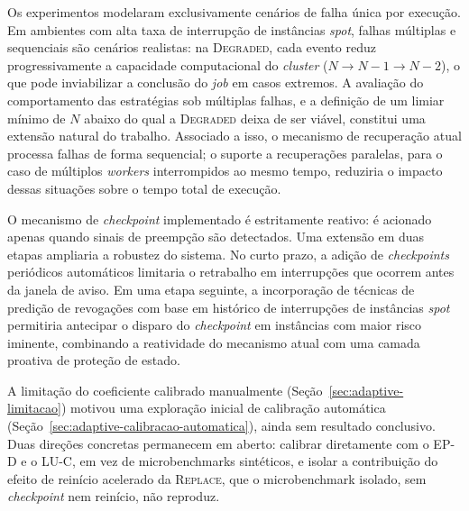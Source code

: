 Os experimentos modelaram exclusivamente cenários de falha única por execução. Em
ambientes com alta taxa de interrupção de instâncias \textit{spot}, falhas múltiplas e
sequenciais são cenários realistas: na \textsc{Degraded}, cada evento reduz
progressivamente a capacidade computacional do \textit{cluster}
($N \rightarrow N\!-\!1 \rightarrow N\!-\!2$), o que pode inviabilizar a conclusão do
\textit{job} em casos extremos. A avaliação do comportamento das estratégias sob
múltiplas falhas, e a definição de um limiar mínimo de $N$ abaixo do qual a
\textsc{Degraded} deixa de ser viável, constitui uma extensão natural do trabalho.
Associado a isso, o mecanismo de recuperação atual processa falhas de forma sequencial;
o suporte a recuperações paralelas, para o caso de múltiplos \textit{workers}
interrompidos ao mesmo tempo, reduziria o impacto dessas situações sobre o tempo total
de execução.

O mecanismo de \textit{checkpoint} implementado é estritamente reativo: é acionado
apenas quando sinais de preempção são detectados. Uma extensão em duas etapas ampliaria
a robustez do sistema. No curto prazo, a adição de \textit{checkpoints} periódicos
automáticos limitaria o retrabalho em interrupções que ocorrem antes da janela de aviso.
Em uma etapa seguinte, a incorporação de técnicas de predição de revogações com base em
histórico de interrupções de instâncias \textit{spot} permitiria antecipar o disparo do
\textit{checkpoint} em instâncias com maior risco iminente, combinando a reatividade do
mecanismo atual com uma camada proativa de proteção de estado.

A limitação do coeficiente calibrado manualmente
(Seção~\ref{sec:adaptive-limitacao}) motivou uma exploração inicial de
calibração automática (Seção~\ref{sec:adaptive-calibracao-automatica}), ainda
sem resultado conclusivo. Duas direções concretas permanecem em aberto:
calibrar diretamente com o EP-D e o LU-C, em vez de microbenchmarks
sintéticos, e isolar a contribuição do efeito de reinício acelerado da
\textsc{Replace}, que o microbenchmark isolado, sem \textit{checkpoint} nem
reinício, não reproduz.

